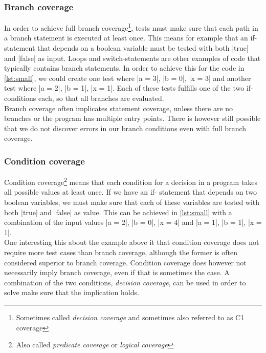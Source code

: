 \subsubsection{Branch coverage}

In order to achieve full branch coverage\footnote{Sometimes called
\emph{decision coverage} and sometimes also referred to as C1 coverage},
tests must make sure that each path in a branch statement is executed at
least once. This means for example that an if-statement that depends on
a boolean variable must be tested with both |true| and |false| as input.
Loops and switch-statements are other examples of code that typically
contains branch statements. In order to achieve this for the code in
\ref{lst:small}, we could create one test where |a = 3|, |b = 0|,
|x = 3| and another test where |a = 2|, |b = 1|, |x = 1|. Each of these
tests fulfills one of the two if-conditions each, so that all branches
are evaluated.\\

Branch coverage often implicates statement coverage, unless there are no
branches or the program has multiple entry points. There is however
still possible that we do not discover errors in our branch conditions
even with full branch coverage.\\


\subsubsection{Condition coverage}

Condition coverage\footnote{Also called \emph{predicate coverage} or
\emph{logical coverage}} means that each condition for a decision in a
program takes all possible values at least once. If we have an if-
statement that depends on two boolean variables, we must make sure that
each of these variables are tested with both |true| and |false| as
value. This can be achieved in \ref{lst:small} with a combination of
the input values |a = 2|, |b = 0|, |x = 4| and |a = 1|, |b = 1|,
|x = 1|.\\

One interesting this about the example above it that condition coverage
does not require more test cases than branch coverage, although the
former is often considered superior to branch coverage. Condition
coverage does however not necessarily imply branch coverage, even if
that is sometimes the case. A combination of the two conditions,
\emph{decision coverage}, can be used in order to solve make sure that
the implication holds.\\


